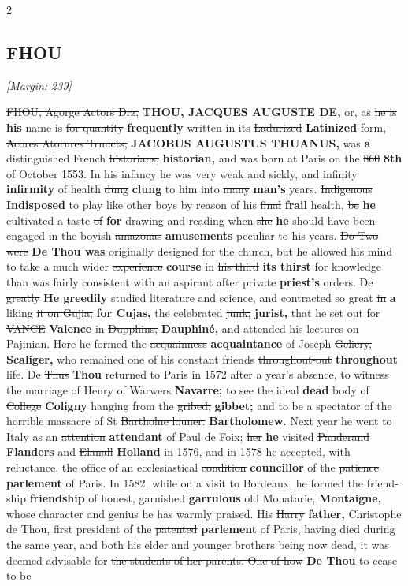 \documentclass[10pt]{article}
\begin{document}
\begin{multicols}{2}
\subsection*{FHOU}
{\small\itshape [Margin: 239]}\par
\sout{FHOU, Agorge Actors Drz,} \textbf{THOU, JACQUES AUGUSTE DE,} or, as \sout{he is} \textbf{his} name is \sout{for quantity} \textbf{frequently} written in its \sout{Ladurized} \textbf{Latinized} form, \sout{Acores Atorures Trnucts,} \textbf{JACOBUS AUGUSTUS THUANUS,} was \textbf{a} distinguished French \sout{historians,} \textbf{historian,} and was born at Paris on the \sout{860} \textbf{8th} of October 1553. In his infancy he was very weak and sickly, and \sout{infinity} \textbf{infirmity} of health \sout{dung} \textbf{clung} to him into \sout{many} \textbf{man's} years. \sout{Indigenous} \textbf{Indisposed} to play like other boys by reason of his \sout{final} \textbf{frail} health, \sout{be} \textbf{he} cultivated a taste \sout{of} \textbf{for} drawing and reading when \sout{she} \textbf{he} should have been engaged in the boyish \sout{amazonas} \textbf{amusements} peculiar to his years. \sout{Do Two were} \textbf{De Thou was} originally designed for the church, but he allowed his mind to take a much wider \sout{experience} \textbf{course} in \sout{his third} \textbf{its thirst} for knowledge than was fairly consistent with an aspirant after \sout{private} \textbf{priest's} orders. \sout{De greatly} \textbf{He greedily} studied literature and science, and contracted so great \sout{in} \textbf{a} liking \sout{it on Gujia,} \textbf{for Cujas,} the celebrated \sout{junk,} \textbf{jurist,} that he set out for \sout{VANCE} \textbf{Valence} in \sout{Dupphins,} \textbf{Dauphiné,} and attended his lectures on Pajinian. Here he formed the \sout{acquainness} \textbf{acquaintance} of Joseph \sout{Geliery,} \textbf{Scaliger,} who remained one of his constant friends \sout{throughout-out} \textbf{throughout} life. De \sout{Thus} \textbf{Thou} returned to Paris in 1572 after a year's absence, to witness the marriage of Henry of \sout{Warwers} \textbf{Navarre;} to see the \sout{ideal} \textbf{dead} body of \sout{College} \textbf{Coligny} hanging from the \sout{gribed;} \textbf{gibbet;} and to be a spectator of the horrible massacre of St \sout{Bartholne louner.} \textbf{Bartholomew.} Next year he went to Italy as an \sout{attention} \textbf{attendant} of Paul de Foix; \sout{her} \textbf{he} visited \sout{Panderand} \textbf{Flanders} and \sout{Elanall} \textbf{Holland} in 1576, and in 1578 he accepted, with reluctance, the office of an ecclesiastical \sout{condition} \textbf{councillor} of the \sout{patience} \textbf{parlement} of Paris. In 1582, while on a visit to Bordeaux, he formed the \sout{friend-ship} \textbf{friendship} of honest, \sout{garnished} \textbf{garrulous} old \sout{Monatarie,} \textbf{Montaigne,} whose character and genius he has warmly praised. His \sout{Harry} \textbf{father,} Christophe de Thou, first president of the \sout{patented} \textbf{parlement} of Paris, having died during the same year, and both his elder and younger brothers being now dead, it was deemed advisable for \sout{the students of her parents. One of how} \textbf{De Thou} to cease to be 
\end{multicols}
\end{document}
